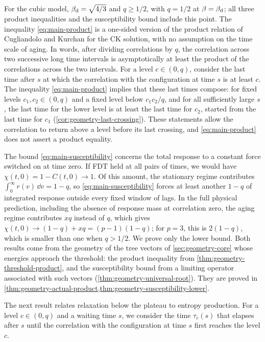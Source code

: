 For the cubic model, $\beta_{\mathrm d}=\sqrt{4/3}$ and $q\ge1/2$, with $q=1/2$ at $\beta=\beta_{\mathrm d}$; all three product inequalities and the susceptibility bound include this point. The inequality \eqref{eq:main-product} is a one-sided version of the product relation of Cugliandolo and Kurchan for the CK solution, with no assumption on the time scale of aging. In words, after dividing correlations by $q$, the correlation across two successive long time intervals is asymptotically at least the product of the correlations across the two intervals. For a level $c\in(0,q)$, consider the last time after $s$ at which the correlation with the configuration at time $s$ is at least $c$. The inequality \eqref{eq:main-product} implies that these last times compose: for fixed levels $c_1,c_2\in(0,q)$ and a fixed level below $c_1c_2/q$, and for all sufficiently large $s$, the last time for the lower level is at least the last time for $c_2$, started from the last time for $c_1$ (\cref{cor:geometry-last-crossing}). These statements allow the correlation to return above a level before its last crossing, and \eqref{eq:main-product} does not assert a product equality.

The bound \eqref{eq:main-susceptibility} concerns the total response to a constant force switched on at time zero. If FDT held at all pairs of times, we would have $\chi(t,0)=1-C(t,0)\to1$. Of this amount, the stationary regime contributes $\int_0^\infty r(v)\,\dd v=1-q$, so \eqref{eq:main-susceptibility} forces at least another $1-q$ of integrated response outside every fixed window of lags. In the full physical prediction, including the absence of response mass at correlation zero, the aging regime contributes $xq$ instead of $q$, which gives $\chi(t,0)\to(1-q)+xq=(p-1)(1-q)$; for $p=3$, this is $2(1-q)$, which is smaller than one when $q>1/2$. We prove only the lower bound. Both results come from the geometry of the tree vectors of \cref{sec:geometry-core} whose energies approach the threshold: the product inequality from \cref{thm:geometry-threshold-product}, and the susceptibility bound from a limiting operator associated with such vectors (\cref{thm:geometry-universal-root}). They are proved in \cref{thm:geometry-actual-product,thm:geometry-susceptibility-lower}.

The next result relates relaxation below the plateau to entropy production. For a level $c\in(0,q)$ and a waiting time $s$, we consider the time $\tau_c(s)$ that elapses after $s$ until the correlation with the configuration at time $s$ first reaches the level $c$.

